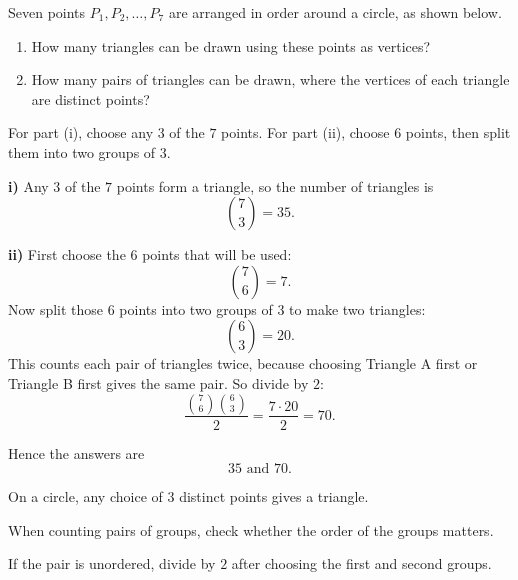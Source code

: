 \begin{problem}
Seven points $P_1,P_2,\dots,P_7$ are arranged in order around a circle, as shown below.

\begin{center}
\end{center}

\begin{enumerate}[label=\roman*)]
\item How many triangles can be drawn using these points as vertices?
\item How many pairs of triangles can be drawn, where the vertices of each triangle are distinct points?
\end{enumerate}
\end{problem}

\begin{hint}
For part (i), choose any $3$ of the $7$ points. For part (ii), choose $6$ points, then split them into two groups of $3$.
\end{hint}

\begin{solution}
\textbf{i)} Any $3$ of the $7$ points form a triangle, so the number of triangles is
\[
\binom{7}{3}=35.
\]

\textbf{ii)} First choose the $6$ points that will be used:
\[
\binom{7}{6}=7.
\]
Now split those $6$ points into two groups of $3$ to make two triangles:
\[
\binom{6}{3}=20.
\]
This counts each pair of triangles twice, because choosing Triangle A first or Triangle B first gives the same pair. So divide by $2$:
\[
\frac{\binom{7}{6}\binom{6}{3}}{2}
=\frac{7\cdot 20}{2}
=70.
\]

Hence the answers are
\[
\boxed{35 \text{ and } 70}.
\]
\end{solution}

\begin{takeaways}
\item On a circle, any choice of $3$ distinct points gives a triangle.
\item When counting pairs of groups, check whether the order of the groups matters.
\item If the pair is unordered, divide by $2$ after choosing the first and second groups.
\end{takeaways}

